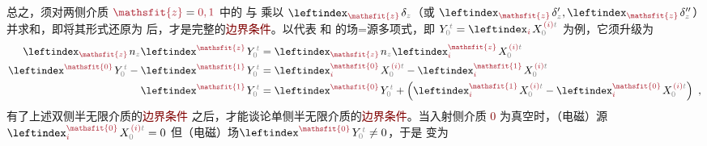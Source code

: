 总之，须对两侧介质 $\textcolor{Maroon}{\mathsfit{z}} = \textcolor{Maroon}{0,1}$ 中的  与  乘以 $\leftindex_{\textcolor{Maroon}{\mathsfit{z}}} \;\! \delta_{\mathcolor{gray}{z}}$（或 $\leftindex_{\textcolor{Maroon}{\mathsfit{z}}} \;\! \delta'_{\mathcolor{gray}{z}},\leftindex_{\textcolor{Maroon}{\mathsfit{z}}} \;\! \delta''_{\mathcolor{gray}{z}}$）并求和，即将其形式还原为  后，才是完整的\textcolor{Maroon}{边界条件}。以代表  和  的场=源多项式，即 $Y^{\;\!\mathcolor{gray}{t}}_{\mathcolor{gray}{0}} = \leftindex_{\textcolor{Maroon}{i}} \;\! X^{\;\!\textcolor{Maroon}{(i)}\mathcolor{gray}{t}}_{\mathcolor{gray}{0}}$ 为例，它须升级为
\begin{subequations} \label{eq:2BC}
\begin{align}
	\leftindex_{\textcolor{Maroon}{\mathsfit{z}}} \;\! n_{\mathcolor{gray}{z}} \leftindex^{\textcolor{Maroon}{\mathsfit{z}}} \;\! Y^{\;\!\mathcolor{gray}{t}}_{\mathcolor{gray}{0}} &= \leftindex_{\textcolor{Maroon}{\mathsfit{z}}} \;\! n_{\mathcolor{gray}{z}} \leftindex^{\textcolor{Maroon}{\mathsfit{z}}}_{\textcolor{Maroon}{i}} \;\! X^{\;\!\textcolor{Maroon}{(i)}\mathcolor{gray}{t}}_{\mathcolor{gray}{0}} \label{eq:^zY_0} \\ \leftindex^{\textcolor{Maroon}{\mathsfit{0}}} \;\! Y^{\;\!\mathcolor{gray}{t}}_{\mathcolor{gray}{0}} - \leftindex^{\textcolor{Maroon}{\mathsfit{1}}} \;\! Y^{\;\!\mathcolor{gray}{t}}_{\mathcolor{gray}{0}} &= \leftindex^{\textcolor{Maroon}{\mathsfit{0}}}_{\textcolor{Maroon}{i}} \;\! X^{\;\!\textcolor{Maroon}{(i)}\mathcolor{gray}{t}}_{\mathcolor{gray}{0}} - \leftindex^{\textcolor{Maroon}{\mathsfit{1}}}_{\textcolor{Maroon}{i}} \;\! X^{\;\!\textcolor{Maroon}{(i)}\mathcolor{gray}{t}}_{\mathcolor{gray}{0}} \label{eq:^0Y_0-^1Y_0} \\ \leftindex^{\textcolor{Maroon}{\mathsfit{1}}} \;\! Y^{\;\!\mathcolor{gray}{t}}_{\mathcolor{gray}{0}} &= \leftindex^{\textcolor{Maroon}{\mathsfit{0}}} \;\! Y^{\;\!\mathcolor{gray}{t}}_{\mathcolor{gray}{0}} + \left( \leftindex^{\textcolor{Maroon}{\mathsfit{1}}}_{\textcolor{Maroon}{i}} \;\! X^{\;\!\textcolor{Maroon}{(i)}\mathcolor{gray}{t}}_{\mathcolor{gray}{0}} - \leftindex^{\textcolor{Maroon}{\mathsfit{0}}}_{\textcolor{Maroon}{i}} \;\! X^{\;\!\textcolor{Maroon}{(i)}\mathcolor{gray}{t}}_{\mathcolor{gray}{0}} \right) ~, \label{eq:^1Y_0}
\end{align}
\end{subequations}
有了上述双侧半无限介质的\textcolor{Maroon}{边界条件}  之后，才能谈论单侧半无限介质的\textcolor{Maroon}{边界条件}。当入射侧介质 \textcolor{Maroon}{0} 为真空时，（电磁）源$\leftindex^{\textcolor{Maroon}{\mathsfit{0}}}_{\textcolor{Maroon}{i}} \;\! X^{\;\!\textcolor{Maroon}{(i)}\mathcolor{gray}{t}}_{\mathcolor{gray}{0}} = 0$ 但（电磁）场$\leftindex^{\textcolor{Maroon}{\mathsfit{0}}} \;\! Y^{\;\!\mathcolor{gray}{t}}_{\mathcolor{gray}{0}} \neq 0$，于是  变为
